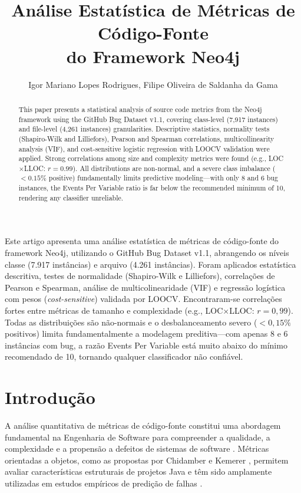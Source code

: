 \documentclass[12pt]{article}
\title{Análise Estatística de Métricas de Código-Fonte\\do Framework Neo4j}
\author{Igor Mariano Lopes Rodrigues\inst{1}, Filipe Oliveira de Saldanha da Gama\inst{1}}
\begin{document}
\maketitle

\begin{abstract}
This paper presents a statistical analysis of source code metrics from the Neo4j framework using the GitHub Bug Dataset v1.1, covering class-level (7{,}917 instances) and file-level (4{,}261 instances) granularities. Descriptive statistics, normality tests (Shapiro-Wilk and Lilliefors), Pearson and Spearman correlations, multicollinearity analysis (VIF), and cost-sensitive logistic regression with LOOCV validation were applied. Strong correlations among size and complexity metrics were found (e.g., LOC$\times$LLOC: $r = 0.99$). All distributions are non-normal, and a severe class imbalance ($<0.15\%$ positive) fundamentally limits predictive modeling---with only 8 and 6 bug instances, the Events Per Variable ratio is far below the recommended minimum of 10, rendering any classifier unreliable.
\end{abstract}

\begin{resumo}
Este artigo apresenta uma análise estatística de métricas de código-fonte do framework Neo4j, utilizando o GitHub Bug Dataset v1.1, abrangendo os níveis classe (7.917 instâncias) e arquivo (4.261 instâncias). Foram aplicados estatística descritiva, testes de normalidade (Shapiro-Wilk e Lilliefors), correlações de Pearson e Spearman, análise de multicolinearidade (VIF) e regressão logística com pesos (\textit{cost-sensitive}) validada por LOOCV. Encontraram-se correlações fortes entre métricas de tamanho e complexidade (e.g., LOC$\times$LLOC: $r = 0{,}99$). Todas as distribuições são não-normais e o desbalanceamento severo ($<0{,}15\%$ positivos) limita fundamentalmente a modelagem preditiva---com apenas 8 e 6 instâncias com bug, a razão Events Per Variable está muito abaixo do mínimo recomendado de 10, tornando qualquer classificador não confiável.
\end{resumo}

\section{Introdução} \label{sec:intro}

A análise quantitativa de métricas de código-fonte constitui uma abordagem fundamental na Engenharia de Software para compreender a qualidade, a complexidade e a propensão a defeitos de sistemas de software \cite{pressman2014}. Métricas orientadas a objetos, como as propostas por Chidamber e Kemerer \cite{chidamber1994}, permitem avaliar características estruturais de projetos Java e têm sido amplamente utilizadas em estudos empíricos de predição de falhas \cite{gyimothy2005, basili1996}.
\end{document}
